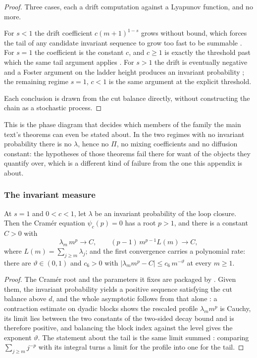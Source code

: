 \begin{proof}
Three cases, each a drift computation against a Lyapunov function, and no more.

For $s<1$ the drift coefficient $c(m+1)^{1-s}$ grows without bound, which forces the tail of
any candidate invariant sequence to grow too fast to be summable
. For $s=1$ the coefficient is the constant
$c$, and $c\geq1$ is exactly the threshold past which the same tail argument applies
. For $s>1$ the drift is eventually
negative and a Foster argument on the ladder height produces an invariant probability
; the remaining regime $s=1$, $c<1$ is the
same argument at the explicit threshold.

Each conclusion is drawn from the cut balance directly, without constructing the chain as a
stochastic process.
\end{proof}

\noindent This is the phase diagram that decides which members of the family the main text's theorems can
even be stated about. In the two regimes with no invariant probability there is no $\lambda$,
hence no $\Pi$, no mixing coefficients and no diffusion constant: the hypotheses of those
theorems fail there for want of the objects they quantify over, which is a different kind of
failure from the one this appendix is about.


\subsubsection{The invariant measure}


\begin{theorem}
  \label{thm:main_invariant_measure}
At $s=1$ and $0<c<1$, let $\lambda$ be an invariant probability of the loop closure. Then the
Cram\'er equation $\psi_c(p)=0$ has a root $p>1$, and there is a constant $C>0$ with
\[ \lambda_m\,m^{p}\longrightarrow C, \qquad (p-1)\,m^{p-1}L(m)\longrightarrow C, \]
where $L(m)=\sum_{j\geq m}\lambda_j$; and the first convergence carries a polynomial rate:
there are $\vartheta\in(0,1)$ and $c_6>0$ with $|\lambda_m m^{p}-C|\leq c_6\,m^{-\vartheta}$ at
every $m\geq1$.
\end{theorem}

\begin{proof}
The Cram\'er root and the parameters it fixes are packaged by .
Given them, the invariant probability yields a positive sequence satisfying the cut balance
above $d$, and the whole asymptotic follows from that alone
: a contraction estimate on dyadic blocks shows the
rescaled profile $\lambda_m m^{p}$ is Cauchy, its limit lies between the two constants of the
two-sided decay bound and is therefore positive, and balancing the block index against the
level gives the exponent $\vartheta$. The statement about the tail is the same limit summed
: comparing $\sum_{j\geq m}j^{-p}$ with its
integral turns a limit for the profile into one for the tail.
\end{proof}

